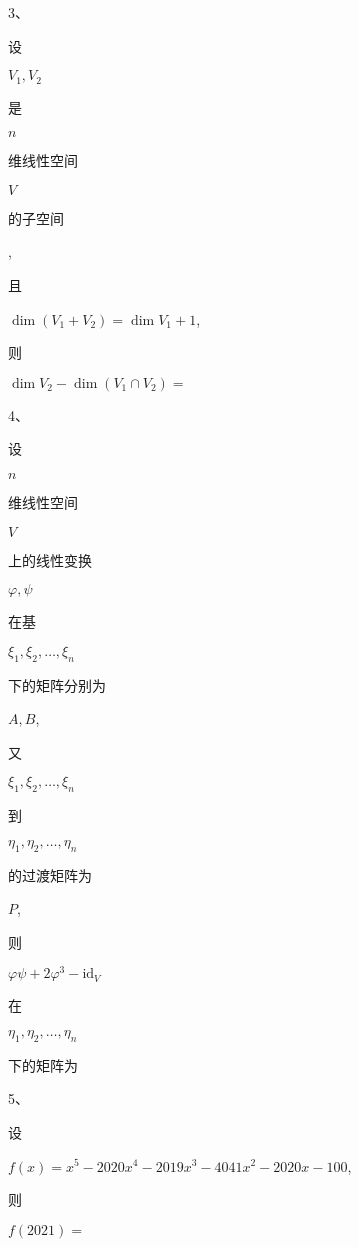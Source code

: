 \documentclass[10pt]{article}
\begin{document}
3、\begin{CJK}{UTF8}{mj}设\end{CJK} $V_{1}, V_{2}$ \begin{CJK}{UTF8}{mj}是\end{CJK} $n$ \begin{CJK}{UTF8}{mj}维线性空间\end{CJK} $V$ \begin{CJK}{UTF8}{mj}的子空间\end{CJK}, \begin{CJK}{UTF8}{mj}且\end{CJK} $\operatorname{dim}\left(V_{1}+V_{2}\right)=\operatorname{dim} V_{1}+1$, \begin{CJK}{UTF8}{mj}则\end{CJK} $\operatorname{dim} V_{2}-\operatorname{dim}\left(V_{1} \cap V_{2}\right)=$

4、\begin{CJK}{UTF8}{mj}设\end{CJK} $n$ \begin{CJK}{UTF8}{mj}维线性空间\end{CJK} $V$ \begin{CJK}{UTF8}{mj}上的线性变换\end{CJK} $\varphi, \psi$ \begin{CJK}{UTF8}{mj}在基\end{CJK} $\xi_{1}, \xi_{2}, \ldots, \xi_{n}$ \begin{CJK}{UTF8}{mj}下的矩阵分别为\end{CJK} $A, B$, \begin{CJK}{UTF8}{mj}又\end{CJK} $\xi_{1}, \xi_{2}, \ldots, \xi_{n}$ \begin{CJK}{UTF8}{mj}到\end{CJK} $\eta_{1}, \eta_{2}, \ldots, \eta_{n}$ \begin{CJK}{UTF8}{mj}的过渡矩阵为\end{CJK} $P$, \begin{CJK}{UTF8}{mj}则\end{CJK} $\varphi \psi+2 \varphi^{3}-\mathrm{id}_{V}$ \begin{CJK}{UTF8}{mj}在\end{CJK} $\eta_{1}, \eta_{2}, \ldots, \eta_{n}$ \begin{CJK}{UTF8}{mj}下的矩阵为\end{CJK}

5、\begin{CJK}{UTF8}{mj}设\end{CJK} $f(x)=x^{5}-2020 x^{4}-2019 x^{3}-4041 x^{2}-2020 x-100$, \begin{CJK}{UTF8}{mj}则\end{CJK} $f(2021)=$
\end{document}
